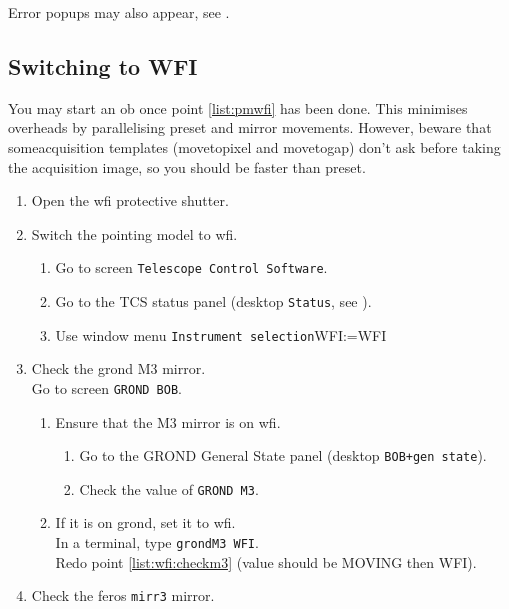 \documentclass[11pt,fleqn,a4paper]{book}
\makeatletter
\def\menu#1#2{\texttt{#1}\ifx{}#2\else\@for\@x:=#2\do{$\rightarrow$\texttt{\@x}}\fi}
\def\wmenu#1#2{window menu \menu{#1}{#2}}
\makeatother
\begin{document}
Error popups may also appear, see .

\subsection{Switching to WFI}

You may start an \gls{ob} once point \ref{list:pmwfi} has been done.  This minimises
overheads by parallelising \gls{preset} and mirror movements.  However, beware that some\gls{acquisition} \gls{template}s (movetopixel and movetogap) don't ask before taking the acquisition image, so you should be faster than preset.  

\begin{enumerate}
  \item Open the \gls{wfi} \gls{protective shutter}.
  \item Switch the \gls{pointing model} to \gls{wfi}.\label{list:pmwfi}
  \begin{enumerate}
    \item Go to screen \texttt{Telescope Control Software}.
    \item Go to the \gls{TCS status panel} (\gls{desktop} \texttt{Status}, see ). 
    \item Use \wmenu{Instrument selection}{WFI}
  \end{enumerate}
  \item Check the \gls{grond} \gls{M3} mirror.\\
        Go to screen \texttt{GROND BOB}.
  \begin{enumerate}
      \item Ensure that the \gls{M3} mirror is on \gls{wfi}.\label{list:wfi:checkm3}
      \begin{enumerate}
         \item Go to the GROND \gls{General State} panel (\gls{desktop} \texttt{BOB+gen state}).
         \item Check the value of \texttt{GROND \gls{M3}}.
      \end{enumerate}
      \item If it is on \gls{grond}, set it to \gls{wfi}.\\
            In a terminal, type \texttt{\gls{grondM3} WFI}.\\
            Redo point \ref{list:wfi:checkm3} (value should be MOVING then WFI).
  \end{enumerate}
  \item Check the \gls{feros} \texttt{\gls{mirr3}} mirror.\\

\end{enumerate}
\end{document}
